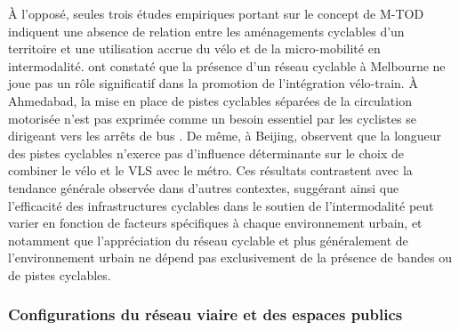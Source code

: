 \begin{refsegment}
À l'opposé, seules trois études empiriques portant sur le concept de \acrshort{M-TOD} indiquent une absence de relation entre les aménagements cyclables d'un territoire et une utilisation accrue du vélo et de la micro-mobilité en intermodalité. \textcolor{blue}{\textcite[403]{weliwitiya_bicycle_2019}} ont constaté que la présence d'un réseau cyclable à Melbourne ne joue pas un rôle significatif dans la promotion de l'intégration vélo-train. À Ahmedabad, la mise en place de pistes cyclables séparées de la circulation motorisée n'est pas exprimée comme un besoin essentiel par les cyclistes se dirigeant vers les arrêts de bus \textcolor{blue}{\autocite[40]{balya_integration_2016}}. De même, à Beijing, \textcolor{blue}{\textcite[55]{zhao_bicycle-metro_2017}} observent que la longueur des pistes cyclables n'exerce pas d'influence déterminante sur le choix de combiner le vélo et le \acrshort{VLS} avec le métro. Ces résultats contrastent avec la tendance générale observée dans d'autres contextes, suggérant ainsi que l'efficacité des infrastructures cyclables dans le soutien de l'intermodalité peut varier en fonction de facteurs spécifiques à chaque environnement urbain, et notamment que l'appréciation du réseau cyclable et plus généralement de l'environnement urbain ne dépend pas exclusivement de la présence de bandes ou de pistes cyclables.%

\subsubsection*{Configurations du réseau viaire et des espaces publics
    \label{chap2:configurations-reseau-viaire-espaces-publics}
    }
    

\end{refsegment}
